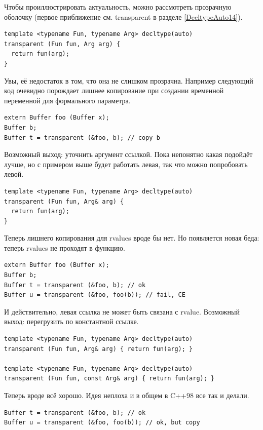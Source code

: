 \documentclass[a4paper,12pt,oneside]{article}
\begin{document}
Чтобы проиллюстрировать актуальность, можно рассмотреть прозрачную оболочку (первое приближение см. transparent в разделе \ref{DecltypeAuto14}).

\begin{lstlisting}
template <typename Fun, typename Arg> decltype(auto)
transparent (Fun fun, Arg arg) { 
  return fun(arg); 
}
\end{lstlisting}

Увы, её недостаток в том, что она не слишком прозрачна. Например следующий код очевидно порождает лишнее копирование при создании временной переменной для формального параметра.

\begin{lstlisting}
extern Buffer foo (Buffer x);
Buffer b;
Buffer t = transparent (&foo, b); // copy b
\end{lstlisting}

Возможный выход: уточнить аргумент ссылкой. Пока непонятно какая подойдёт лучше, но с примером выше будет работать левая, так что можно попробовать левой.

\begin{lstlisting}
template <typename Fun, typename Arg> decltype(auto)
transparent (Fun fun, Arg& arg) {
  return fun(arg); 
}
\end{lstlisting}

Теперь лишнего копирования для rvalues вроде бы нет. Но появляется новая беда: теперь rvalues не проходят в функцию.

\begin{lstlisting}
extern Buffer foo (Buffer x);
Buffer b;
Buffer t = transparent (&foo, b); // ok
Buffer u = transparent (&foo, foo(b)); // fail, CE
\end{lstlisting}

И действительно, левая ссылка не может быть связана с rvalue. Возможный выход: перегрузить по константной ссылке.

\begin{lstlisting}
template <typename Fun, typename Arg> decltype(auto)
transparent (Fun fun, Arg& arg) { return fun(arg); }

template <typename Fun, typename Arg> decltype(auto)
transparent (Fun fun, const Arg& arg) { return fun(arg); }
\end{lstlisting}

Теперь вроде всё хорошо. Идея неплоха и в общем в C++98 все так и делали.

\begin{lstlisting}
Buffer t = transparent (&foo, b); // ok
Buffer u = transparent (&foo, foo(b)); // ok, but copy
\end{lstlisting}
\end{document}
